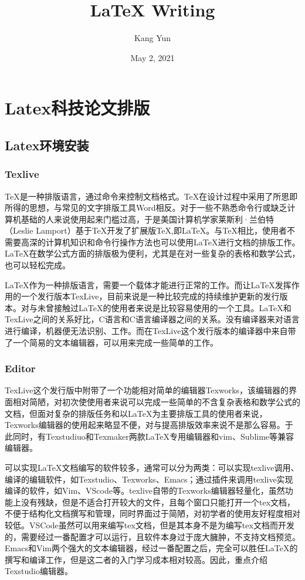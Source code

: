 \documentclass[12pt]{book}
\title{\LaTeX{} Writing}
\author{Kang Yun}
\date{May 2, 2021}
\begin{document}
\maketitle
\frontmatter

\tableofcontents

\part{Latex科技论文排版}

\chapter{Latex环境安装}

\section{Texlive}

\TeX{}是一种排版语言，通过命令来控制文档格式。\TeX{}在设计过程中采用了所思即所得的思想，与常见的文字排版工具Word相反。对于一些不熟悉命令行或缺乏计算机基础的人来说使用起来门槛过高，于是美国计算机学家莱斯利·兰伯特（Leslie Lamport）基于\TeX{}开发了扩展版\TeX{},即\LaTeX{}。与\TeX{}相比，使用者不需要高深的计算机知识和命令行操作方法也可以使用\LaTeX{}进行文档的排版工作。\LaTeX{}在数学公式方面的排版极为便利，尤其是在对一些复杂的表格和数学公式，也可以轻松完成。

\LaTeX{}作为一种排版语言，需要一个载体才能进行正常的工作。而让\LaTeX{}发挥作用的一个发行版本TexLive，目前来说是一种比较完成的持续维护更新的发行版本。对与未曾接触过\LaTeX{}的使用者来说是比较容易使用的一个工具。\LaTeX{}和TexLive之间的关系好比，C语言和C语言编译器之间的关系。没有编译器来对语言进行编译，机器便无法识别、工作。而在TexLive这个发行版本的编译器中来自带了一个简易的文本编辑器，可以用来完成一些简单的工作。

\section{Editor}

TexLive这个发行版中附带了一个功能相对简单的编辑器Texworks，该编辑器的界面相对简陋，对初次使使用者来说可以完成一些简单的不含复杂表格和数学公式的文档，但面对复杂的排版任务和以\LaTeX{}为主要排版工具的使用者来说，Texworks编辑器的使用起来略显不便，对与提高排版效率来说不是那么容易。于此同时，有Texstudiuo和Texmaker两款\LaTeX{}专用编辑器和vim、Sublime等兼容编辑器。

可以实现\LaTeX{}文档编写的软件较多，通常可以分为两类：可以实现texlive调用、编译的编辑软件，如Texstudio、Texworks、Emacs；通过插件来调用texlive实现编译的软件，如Vim、VScode等。texlive自带的Texworks编辑器轻量化，虽然功能上没有残缺，但是不适合打开较大的文件，且每个窗口只能打开一个tex文档，不便于结构化文档撰写和管理，同时界面过于简陋，对初学者的使用友好程度相对较低。VSCode虽然可以用来编写tex文档，但是其本身不是为编写tex文档而开发的，需要经过一番配置才可以运行，且软件本身过于庞大臃肿，不支持文档预览。Emacs和Vim两个强大的文本编辑器，经过一番配置之后，完全可以胜任\LaTeX{}的撰写和编译工作，但是这二者的入门学习成本相对较高。因此，重点介绍Texstudio编辑器。
\end{document}
